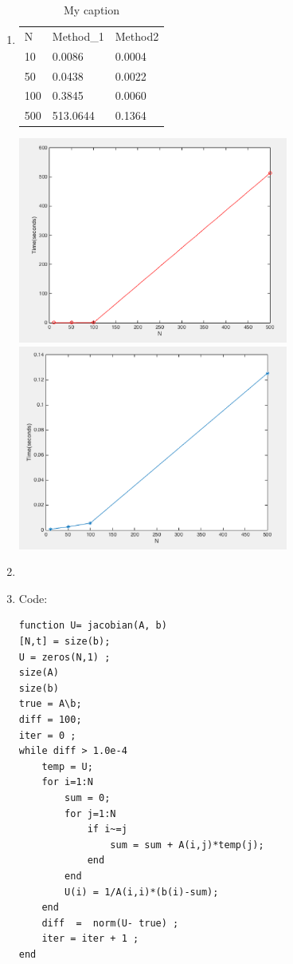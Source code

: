 \documentclass{article}
\begin{document}
\begin{enumerate}
\item 
\begin{table}[]
\centering
\caption{My caption}
\label{my-label}
\begin{tabular}{lll}
N   & Method\_1 & Method2 \\
10  & 0.0086    & 0.0004  \\
50  & 0.0438    & 0.0022  \\
100 & 0.3845    & 0.0060  \\
500 & 513.0644  & 0.1364 
\end{tabular}
\end{table}

\includegraphics[width=0.7\textwidth]{method1} 
\includegraphics[width=0.7\textwidth]{method2} 



\item


\item 

Code: \\
\begin{lstlisting} 
function U= jacobian(A, b)
[N,t] = size(b); 
U = zeros(N,1) ; 
size(A) 
size(b) 
true = A\b; 
diff = 100; 
iter = 0 ; 
while diff > 1.0e-4 
    temp = U; 
    for i=1:N
        sum = 0; 
        for j=1:N
            if i~=j
                sum = sum + A(i,j)*temp(j); 
            end
        end
        U(i) = 1/A(i,i)*(b(i)-sum); 
    end
    diff  =  norm(U- true) ; 
    iter = iter + 1 ; 
end 


\end{lstlisting}
\end{enumerate}
\end{document}

